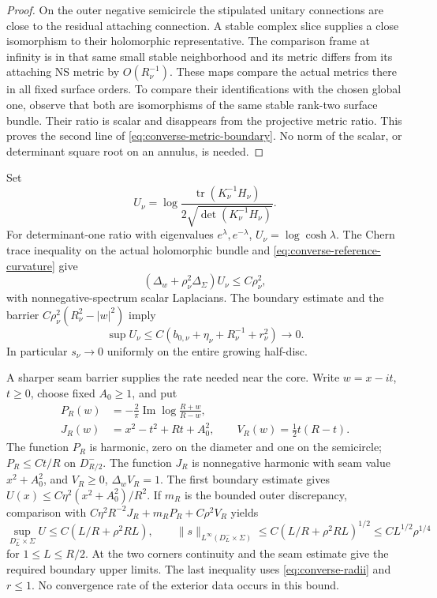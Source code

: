 \documentclass[11pt]{amsart}
\theoremstyle{definition}
\theoremstyle{remark}
\theoremstyle{plain}
\newcommand{\tr}{\operatorname{tr}}
\begin{document}
\begin{proof}
On the outer negative semicircle the stipulated unitary connections
are close to the residual attaching connection. A stable complex
slice supplies a close isomorphism to their holomorphic representative.
The comparison frame at infinity is in that same small stable
neighborhood and its metric differs from its attaching NS metric by
$O(R_\nu^{-1})$. These maps compare the actual metrics there in all
fixed surface orders. To compare their identifications with the
chosen global one, observe that both are isomorphisms of the same
stable rank-two surface bundle. Their ratio is scalar and disappears
from the projective metric ratio. This proves the second line of
\eqref{eq:converse-metric-boundary}. No norm of the scalar, or
determinant square root on an annulus, is needed.
\end{proof}

Set
\[
 U_\nu=\log\frac{\tr(K_\nu^{-1}H_\nu)}
                   {2\sqrt{\det(K_\nu^{-1}H_\nu)}}.
\]
For determinant-one ratio with eigenvalues $e^\lambda,e^{-\lambda}$,
$U_\nu=\log\cosh\lambda$. The Chern trace inequality on the actual
holomorphic bundle and \eqref{eq:converse-reference-curvature} give
\begin{equation}\label{eq:converse-scalar-inequality}
       (\Delta_w+\rho_\nu^2\Delta_\Sigma)U_\nu\leq C\rho_\nu^2,
\end{equation}
with nonnegative-spectrum scalar Laplacians. The boundary estimate
and the barrier $C\rho_\nu^2(R_\nu^2-|w|^2)$ imply
\[
 \sup U_\nu\leq C(b_{0,\nu}+\eta_\nu+R_\nu^{-1}+r_\nu^2)\to0.
\]
In particular $s_\nu\to0$ uniformly on the entire growing half-disc.

A sharper seam barrier supplies the rate needed near the core.
Write $w=x-it$, $t\geq0$, choose fixed $A_0\geq1$, and put
\begin{equation}\label{eq:converse-sharp-barrier}
\begin{split}
 P_R(w)&=-\frac2\pi\operatorname{Im}\log\frac{R+w}{R-w},\\
 J_R(w)&=x^2-t^2+Rt+A_0^2,\qquad
 V_R(w)=\tfrac12t(R-t).
\end{split}
\end{equation}
The function $P_R$ is harmonic, zero on the diameter and one on
the semicircle; $P_R\leq Ct/R$ on $D_{R/2}^-$. The function
$J_R$ is nonnegative harmonic with seam value $x^2+A_0^2$,
and $V_R\geq0$, $\Delta_wV_R=1$.
The first boundary estimate gives
$U(x)\leq C\eta^2(x^2+A_0^2)/R^2$.
If $m_R$ is the bounded outer discrepancy, comparison with
$C\eta^2R^{-2}J_R+m_RP_R+C\rho^2V_R$ yields
\begin{equation}\label{eq:converse-inner-scalar}
 \sup_{D_L^-\times\Sigma}U\leq C(L/R+\rho^2RL),\qquad
 \|s\|_{L^\infty(D_L^-\times\Sigma)}
        \leq C(L/R+\rho^2RL)^{1/2}\leq CL^{1/2}\rho^{1/4}
\end{equation}
for $1\leq L\leq R/2$. At the two corners continuity and the
seam estimate give the required boundary upper limits.
The last inequality uses \eqref{eq:converse-radii} and $r\leq1$.
No convergence rate of the exterior data occurs in this bound.
\end{document}
